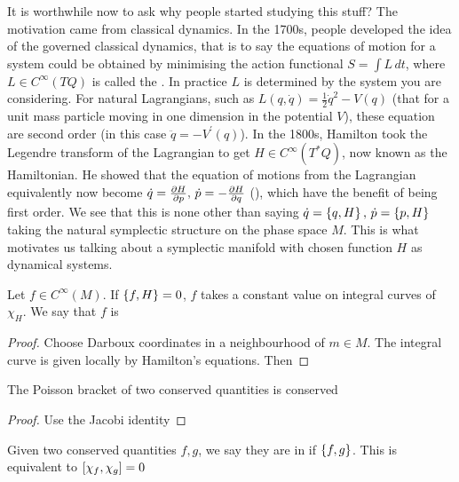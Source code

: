 \documentclass{article}
\begin{document}
\begin{remark}
It is worthwhile now to ask why people started studying this stuff? The motivation came from classical dynamics. In the 1700s, people developed the idea of the  governed classical dynamics, that is to say the equations of motion for a system could be obtained by minimising the action functional $S = \int L \, dt$, where $L\in C^\infty(TQ)$ is called the . In practice $L$ is determined by the system you are considering. For natural Lagrangians, such as $L(q,\dot{q}) = \frac{1}{2}\dot{q}^2 - V(q)$ (that for a unit mass particle moving in one dimension in the potential $V$), these equation are second order (in this case $\ddot{q} = -V^\prime(q)$). In the 1800s, Hamilton took the Legendre transform of the Lagrangian to get $H \in C^\infty(T^\ast Q)$, now known as the Hamiltonian. He showed that the equation of motions from the Lagrangian equivalently now become $\dot{q} = \pd[H]{p},\, \dot{p} = -\pd[H]{q}$ (), which have the benefit of being first order. We see that this is none other than saying $\dot{q} = \acomm[q]{H}, \, \dot{p} = \acomm[p]{H}$ taking the natural symplectic structure on the phase space $M$. This is what motivates us talking about a symplectic manifold with chosen function $H$ as dynamical systems.
\end{remark}

\begin{prop}
Let $f \in C^\infty(M)$. If $\acomm[f]{H} =0$, $f$ takes a constant value on integral curves of $\chi_H$. We say that $f$ is 
\end{prop}
\begin{proof}
Choose Darboux coordinates in a neighbourhood of $m \in M$. The integral curve is given locally by Hamilton's equations. Then 
\end{proof}

\begin{prop}
The Poisson bracket of two conserved quantities is conserved
\end{prop}
\begin{proof}
Use the Jacobi identity
\end{proof}

\begin{definition}
Given two conserved quantities $f,g$, we say they are in  if $\acomm[f]{g}$. This is equivalent to $\comm[\chi_f]{\chi_g} = 0$ 
\end{definition}
\end{document}

